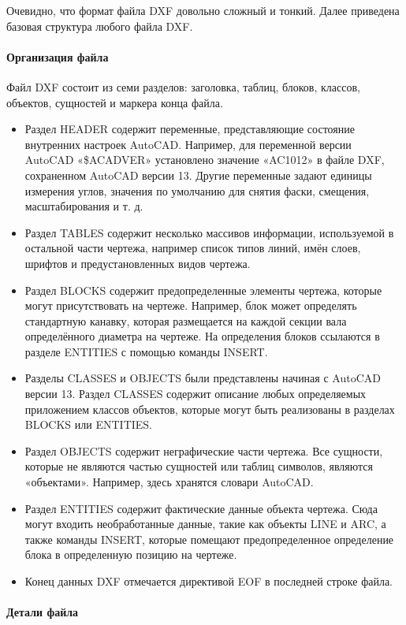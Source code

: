 Очевидно, что формат файла DXF довольно сложный и тонкий. Далее приведена базовая структура любого файла DXF.

\paragraph{Организация файла}

Файл DXF состоит из семи разделов: заголовка, таблиц, блоков, классов, объектов, сущностей и маркера конца файла.

\begin{itemize}
	\item Раздел HEADER содержит переменные, представляющие состояние внутренних настроек AutoCAD. Например, для переменной версии AutoCAD «\$ACADVER» установлено значение «AC1012» в файле DXF, сохраненном AutoCAD версии 13. Другие переменные задают единицы измерения углов, значения по умолчанию для снятия фаски, смещения, масштабирования и т. д.
	\item Раздел TABLES содержит несколько массивов информации, используемой в остальной части чертежа, например список типов линий, имён слоев, шрифтов и предустановленных видов чертежа.
	\item Раздел BLOCKS содержит предопределенные элементы чертежа, которые могут присутствовать на чертеже. Например, блок может определять стандартную канавку, которая размещается на каждой секции вала определённого диаметра на чертеже. На определения блоков ссылаются в разделе ENTITIES с помощью команды INSERT.
	\item Разделы CLASSES и OBJECTS были представлены начиная с AutoCAD версии 13. Раздел CLASSES содержит описание любых определяемых приложением классов объектов, которые могут быть реализованы в разделах BLOCKS или ENTITIES.
	\item Раздел OBJECTS содержит неграфические части чертежа. Все сущности, которые не являются частью сущностей или таблиц символов, являются «объектами». Например, здесь хранятся словари AutoCAD.
	\item Раздел ENTITIES содержит фактические данные объекта чертежа. Сюда могут входить необработанные данные, такие как объекты LINE и ARC, а также команды INSERT, которые помещают предопределенное определение блока в определенную позицию на чертеже.
	\item Конец данных DXF отмечается директивой EOF в последней строке файла.
\end{itemize}

\paragraph{Детали файла}


